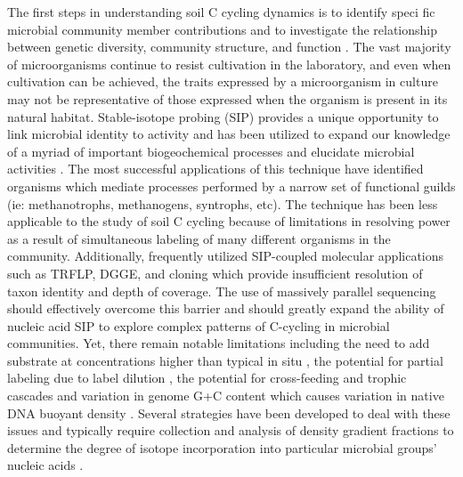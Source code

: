 The first steps in understanding soil C cycling dynamics is to identify speci fic microbial community member contributions and to investigate the relationship between genetic diversity, community structure, and function \cite{O_Donnell_2002}. The vast majority of microorganisms continue to resist cultivation in the laboratory, and even when cultivation can be achieved, the traits expressed by a microorganism in culture may not be representative of those expressed when the organism is present in its natural habitat. Stable-isotope probing (SIP) provides a unique opportunity to link microbial identity to activity and has been utilized to expand our knowledge of a myriad of important biogeochemical processes and elucidate microbial activities \cite{Chen_Murrell_2010}. The most successful applications of this technique have identified organisms which mediate processes performed by a narrow set of functional guilds (ie: methanotrophs, methanogens, syntrophs, etc). The technique has been less applicable to the study of soil C cycling because of limitations in resolving power as a result of simultaneous labeling of many different organisms in the community. Additionally, frequently utilized SIP-coupled molecular applications such as TRFLP, DGGE, and cloning which provide insufficient resolution of taxon identity and depth of coverage. The use of massively parallel sequencing should effectively overcome this barrier and should greatly expand the ability of nucleic acid SIP to explore complex patterns of C-cycling in microbial communities. Yet, there remain notable limitations including the need to add substrate at concentrations higher than typical in situ \cite{radajewski2000stable}, the potential for partial labeling due to label dilution \cite{radajewski2000stable,Manefield_2002,McDonald_2005}, the potential for cross-feeding and trophic cascades \cite{Morris_2002,Hutchens_2003,Lueders_2003,DeRito_2005,Mahmood_2005,McDonald_2005,Ziegler_2005} and variation in genome G+C content which causes variation in native DNA buoyant density \cite{Buckley_2007,9780408708036,HOLBEN_1995,9546163}. Several strategies have been developed to deal with these issues and typically require collection and analysis of density gradient fractions to determine the degree of isotope incorporation into particular microbial groups' nucleic acids \cite{Manefield_2002,Manefield_2002,14686943}. 

